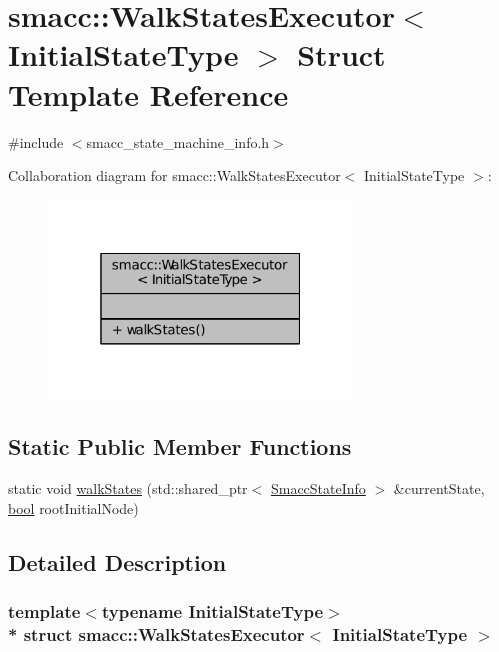 \hypertarget{structsmacc_1_1WalkStatesExecutor}{}\section{smacc\+:\+:Walk\+States\+Executor$<$ Initial\+State\+Type $>$ Struct Template Reference}
\label{structsmacc_1_1WalkStatesExecutor}


{\ttfamily \#include $<$smacc\+\_\+state\+\_\+machine\+\_\+info.\+h$>$}



Collaboration diagram for smacc\+:\+:Walk\+States\+Executor$<$ Initial\+State\+Type $>$\+:
\nopagebreak
\begin{figure}[H]
\begin{center}
\leavevmode
\includegraphics[width=229pt]{structsmacc_1_1WalkStatesExecutor__coll__graph}
\end{center}
\end{figure}
\subsection*{Static Public Member Functions}
\begin{DoxyCompactItemize}
\item 
static void \hyperlink{structsmacc_1_1WalkStatesExecutor_a11a2b02eafb62ec298bcf5ffbb32848b}{walk\+States} (std\+::shared\+\_\+ptr$<$ \hyperlink{classsmacc_1_1SmaccStateInfo}{Smacc\+State\+Info} $>$ \&current\+State, \hyperlink{classbool}{bool} root\+Initial\+Node)
\end{DoxyCompactItemize}


\subsection{Detailed Description}
\subsubsection*{template$<$typename Initial\+State\+Type$>$\\*
struct smacc\+::\+Walk\+States\+Executor$<$ Initial\+State\+Type $>$}



